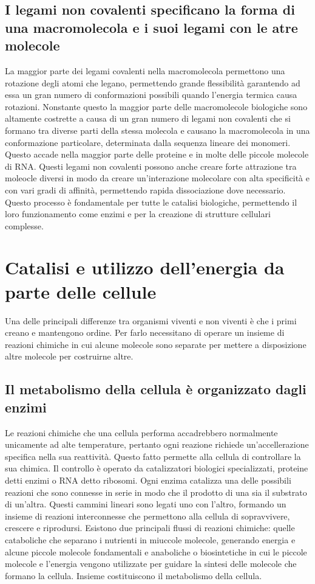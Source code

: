 \subsection{I legami non covalenti specificano la forma di una macromolecola e i suoi legami con le atre molecole}
La maggior parte dei legami covalenti nella macromolecola permettono una rotazione degli atomi che legano, permettendo grande flessibilit\`a garantendo ad essa un gran numero di 
conformazioni possibili quando l'energia termica causa rotazioni. Nonstante questo la maggior parte delle macromolecole biologiche sono altamente costrette a causa di un gran numero di
legami non covalenti che si formano tra diverse parti della stessa molecola e causano la macromolecola in una conformazione particolare, determinata dalla sequenza lineare dei monomeri.
Questo accade nella maggior parte delle proteine e in molte delle piccole molecole di RNA. Questi legami non covalenti possono anche creare forte attrazione tra moleocle diversi in modo
da creare un'interazione molecolare con alta specificit\`a e con vari gradi di affinit\`a, permettendo rapida dissociazione dove necessario. Questo processo \`e fondamentale per tutte le
catalisi biologiche, permettendo il loro funzionamento come enzimi e per la creazione di strutture cellulari complesse. 
\section{Catalisi e utilizzo dell'energia da parte delle cellule}
Una delle principali differenze tra organismi viventi e non viventi \`e che i primi creano e mantengono ordine. Per farlo necessitano di operare un insieme di reazioni chimiche in cui 
alcune molecole sono separate per mettere a disposizione altre molecole per costruirne altre.
\subsection{Il metabolismo della cellula \`e organizzato dagli enzimi}
Le reazioni chimiche che una cellula performa accadrebbero normalmente unicamente ad alte temperature, pertanto ogni reazione richiede un'accellerazione specifica nella sua reattivit\`a.
Questo fatto permette alla cellula di controllare la sua chimica. Il controllo \`e operato da catalizzatori biologici specializzati, proteine detti enzimi o RNA detto ribosomi. Ogni
enzima catalizza una delle possibili reazioni che sono connesse in serie in modo che il prodotto di una sia il substrato di un'altra. Questi cammini lineari sono legati uno con l'altro,
formando un insieme di reazioni interconnesse che permettono alla cellula di sopravvivere, crescere e riprodursi. Esistono due principali flussi di reazioni chimiche: quelle cataboliche
che separano i nutrienti in miuccole molecole, generando energia e alcune  piccole molecole fondamentali e anaboliche o biosintetiche in cui le piccole molecole e l'energia vengono
utilizzate per guidare la sintesi delle molecole che formano la cellula. Insieme costituiscono il metabolismo della cellula. 
